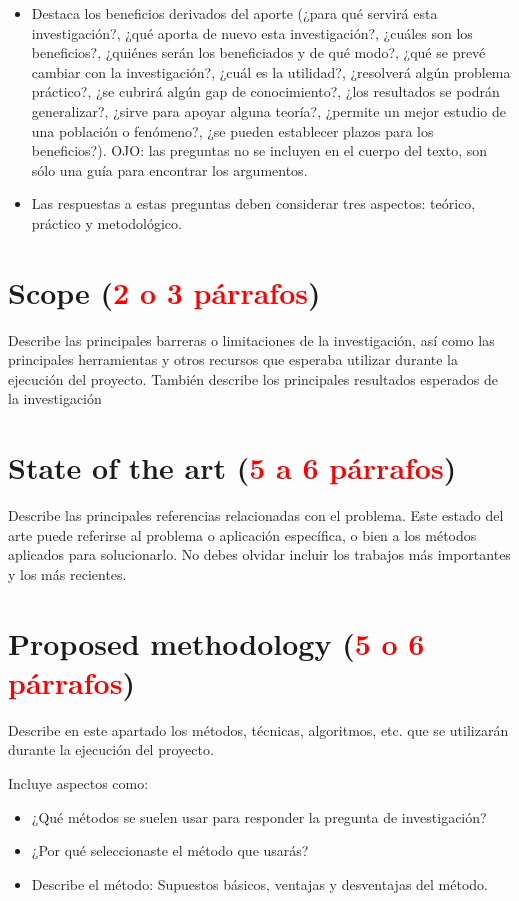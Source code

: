 \documentclass[12pt,letterpaper]{article}
\begin{document}
\begin{itemize}
\item Destaca los beneficios derivados del aporte (¿para qué servirá esta investigación?, ¿qué aporta de nuevo esta investigación?, ¿cuáles son los beneficios?, ¿quiénes serán los beneficiados y de qué modo?, ¿qué se prevé cambiar con la investigación?, ¿cuál es la utilidad?, ¿resolverá algún problema práctico?, ¿se cubrirá algún gap de conocimiento?, ¿los resultados se podrán generalizar?, ¿sirve para apoyar alguna teoría?, ¿permite un mejor estudio de una población o fenómeno?, ¿se pueden establecer plazos para los beneficios?). OJO: las preguntas no se incluyen en el cuerpo del texto, son sólo una guía para encontrar los argumentos.
\item Las respuestas a estas preguntas deben considerar tres aspectos: teórico, práctico y metodológico.
\end{itemize}


\section{Scope (\textcolor{red}{2 o 3 párrafos})}

Describe las principales barreras o limitaciones de la investigación,
así como las principales herramientas y otros recursos que esperaba utilizar
durante la ejecución del proyecto. También describe los principales
resultados esperados de la investigación

\section{State of the art (\textcolor{red}{5 a 6 párrafos})}

Describe las principales referencias relacionadas con el problema. Este estado
del arte puede referirse al problema o aplicación específica, o bien a los
métodos aplicados para solucionarlo. No debes olvidar incluir los trabajos más
importantes y los más recientes.

\section{Proposed methodology (\textcolor{red}{5 o 6 párrafos})}

Describe en este apartado los métodos, técnicas, algoritmos, etc. que se
utilizarán durante la ejecución del proyecto.

Incluye aspectos como:

\begin{itemize}
\item ¿Qué métodos se suelen usar para responder la pregunta de investigación?
\item ¿Por qué seleccionaste el método que usarás?
\item Describe el método: Supuestos básicos, ventajas y desventajas del método.
\end{itemize}
\end{document}
